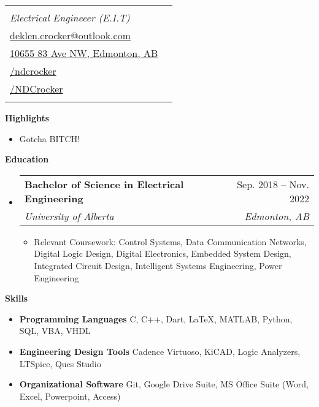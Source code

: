 \documentclass[letterpaper,12pt]{article}[leftmargin=*]
\makeatletter
\def \fullname {Nicolas Deklen Crocker}
\def \subtitle {Electrical Engineeer (E.I.T)}
\def \linkedinicon {\faLinkedin}
\def \linkedinlink {https://linkedin.com/in/ndcrocker/}
\def \linkedintext {/ndcrocker}
\def \phoneicon {\faPhone}
\def \phonetext {+1 (825) 333-4907}
\def \emailicon {\faEnvelope}
\def \emaillink {mailto:deklen.crocker@outlook.com}
\def \emailtext {deklen.crocker@outlook.com}
\def \githubicon {\faGithub}
\def \githublink {https://github.com/NDCrocker}
\def \githubtext {/NDCrocker}
\def \addyicon {\faHome}
\def \addylink {https://goo.gl/maps/KHCJbwCxgCt38gPK7} %
\def \addytext {10655 83 Ave NW, Edmonton, AB}
\def \headertype {\singlecol} %
\def \entryspacing {-0pt}
\def \linkedin {\linkedinicon \hspace{3pt}\href{\linkedinlink}{\linkedintext}}
\def \phone {\phoneicon \hspace{3pt}{ \phonetext}}
\def \email {\emailicon \hspace{3pt}\href{\emaillink}{\emailtext}}
\def \github {\githubicon \hspace{3pt}\href{\githublink}{\githubtext}}
\def \addy {\addyicon \hspace{3pt}\href{\addylink}{\addytext}}
\renewcommand{\section}[2]{\vspace{5pt}
  \colorbox{secondary}{\color{white}\raggedbottom\normalsize\textbf{{#1}{\hspace{7pt}#2}}}
}
\newcommand{\resumeEntryStart}{\begin{itemize}[leftmargin=2.5mm]}
\newcommand{\resumeEntryEnd}{\end{itemize}\vspace{\entryspacing}}
\newcommand{\resumeItemListStart}{\begin{itemize}[leftmargin=4.5mm]}
\newcommand{\resumeItemListEnd}{\end{itemize}}
\newcommand{\resumeItem}[1]{
  \item\small{
    {#1 \vspace{-2pt}}
  }
}
\newcommand{\resumeEntryTSDL}[4]{
  \vspace{-1pt}\item[]
    \begin{tabularx}{0.97\textwidth}{X@{\hspace{60pt}}r}
      \textbf{\color{primary}#1} & {\firabook\color{accent}\small#2} \\
      \textit{\color{accent}\small#3} & \textit{\color{accent}\small#4} \\
    \end{tabularx}\vspace{-6pt}
}
\newcommand{\resumeEntryS}[2]{
  \item[]\small{
    \textbf{\color{primary}#1 }{ #2 \vspace{-6pt}}
  }
}
\newcommand{\doublecol}[6]{
  \begin{tabularx}{\textwidth}{Xr}
    {
      \begin{tabular}[c]{l}
        \fontsize{35}{45}\selectfont{\color{primary}{{\textbf{\fullname}}}} \\
        {\textit{\subtitle}} %
      \end{tabular}
    } & {
      \begin{tabular}[c]{l@{\hspace{1.5em}}l}
        {\small#4} & {\small#1} \\
        {\small#5} & {\small#2} \\
        {\small#6} & {\small#3}
      \end{tabular}
    }
  \end{tabularx}
}
\newcommand{\singlecol}[6]{
  \begin{tabularx}{\textwidth}{Xr}
    {
      \begin{tabular}[b]{l}
        \fontsize{35}{45}\selectfont{\color{primary}{{\textbf{\fullname}}}} \\
        {\textit{\subtitle}} %
      \end{tabular}
    } & {
      \begin{tabular}[c]{l}
        {\small#1} \\
        {\small#2} \\
        {\small#3} \\
        {\small#4} \\
        {\small#5} \\
        {\small#6}
      \end{tabular}
    }
  \end{tabularx}
}
\makeatother
\begin{document}


\headertype{\phone}{\email}{\addy}{\linkedin}{\github}{} %
\vspace{-20pt} %

\section{}{Highlights}
  \resumeItemListStart
    \resumeItem{Gotcha BITCH!}
  \resumeItemListEnd
\section{\faGraduationCap}{Education}

  \resumeEntryStart
    \resumeEntryTSDL
      {Bachelor of Science in Electrical Engineering}{Sep. 2018 -- Nov. 2022}
      {University of Alberta}{Edmonton, AB}
  \resumeItemListStart
    \resumeItem{Relevant Coursework: Control Systems, Data Communication Networks, Digital Logic Design, Digital Electronics, Embedded System Design, Integrated Circuit Design, Intelligent Systems Engineering, Power Engineering}
  \resumeItemListEnd
  \resumeEntryEnd

\section{\faGears}{Skills}

  \resumeEntryStart
   \resumeEntryS{Programming Languages } {C, C++, Dart, LaTeX, MATLAB, Python, SQL, VBA, VHDL}
   \resumeEntryS{Engineering Design Tools } {Cadence Virtuoso, KiCAD, Logic Analyzers, LTSpice, Qucs Studio}
   \resumeEntryS{Organizational Software } {Git, Google Drive Suite, MS Office Suite (Word, Excel, Powerpoint, Access)}
  \resumeEntryEnd
\end{document}
